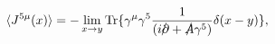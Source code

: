 \begin{equation}
\langle J^{5\mu}(x) \rangle = -\lim_{x \rightarrow y} {\rm
Tr}\{\gamma^\mu \gamma^5 {1 \over
{(i{\partial\kern-0.15em\raise0.17ex\llap{/}\kern0.15em\relax} +
{A\kern-0.15em\raise0.17ex\llap{/}\kern0.15em\relax}\gamma^5)}}\delta(x-y)\},
\end{equation}


